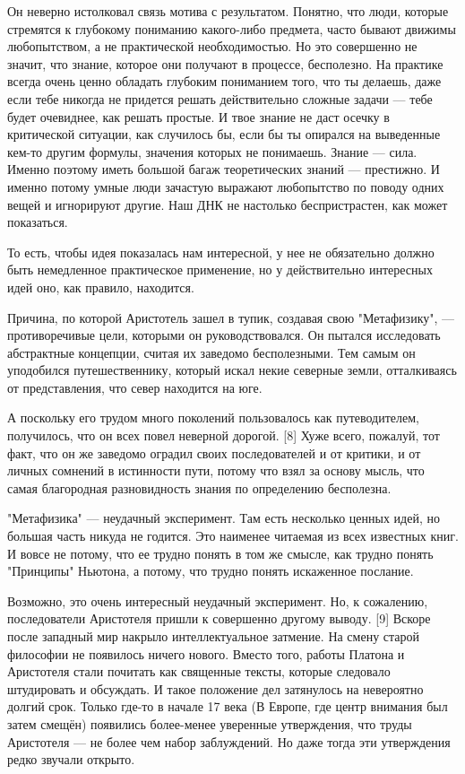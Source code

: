 \documentclass[ebook,12pt,oneside,openany]{memoir}
\begin{document}
Он неверно истолковал связь мотива с результатом. Понятно, что люди,
которые стремятся к глубокому пониманию какого-либо предмета, часто
бывают движимы любопытством, а не практической необходимостью. Но это
совершенно не значит, что знание, которое они получают в процессе,
бесполезно. На практике всегда очень ценно обладать глубоким
пониманием того, что ты делаешь, даже если тебе никогда не придется
решать действительно сложные задачи — тебе будет очевиднее, как решать
простые. И твое знание не даст осечку в критической ситуации, как
случилось бы, если бы ты опирался на выведенные кем-то другим формулы,
значения которых не понимаешь. Знание — сила. Именно поэтому иметь
большой багаж теоретических знаний — престижно. И именно потому умные
люди зачастую выражают любопытство по поводу одних вещей и игнорируют
другие. Наш ДНК не настолько беспристрастен, как может показаться.

То есть, чтобы идея показалась нам интересной, у нее не обязательно
должно быть немедленное практическое применение, но у действительно
интересных идей оно, как правило, находится.

Причина, по которой Аристотель зашел в тупик, создавая свою
"Метафизику", — противоречивые цели, которыми он руководствовался. Он
пытался исследовать абстрактные концепции, считая их заведомо
бесполезными. Тем самым он уподобился путешественнику, который искал
некие северные земли, отталкиваясь от представления, что север
находится на юге.

А поскольку его трудом много поколений пользовалось как путеводителем,
получилось, что он всех повел неверной дорогой. [8] Хуже всего,
пожалуй, тот факт, что он же заведомо оградил своих последователей и
от критики, и от личных сомнений в истинности пути, потому что взял за
основу мысль, что самая благородная разновидность знания по
определению бесполезна.

"Метафизика" — неудачный эксперимент. Там есть несколько ценных идей,
но большая часть никуда не годится. Это наименее читаемая из всех
известных книг. И вовсе не потому, что ее трудно понять в том же
смысле, как трудно понять "Принципы" Ньютона, а потому, что трудно
понять искаженное послание.

Возможно, это очень интересный неудачный эксперимент. Но, к сожалению,
последователи Аристотеля пришли к совершенно другому выводу. [9]
Вскоре после западный мир накрыло интеллектуальное затмение. На смену
старой философии не появилось ничего нового. Вместо того, работы
Платона и Аристотеля стали почитать как священные тексты, которые
следовало штудировать и обсуждать. И такое положение дел затянулось на
невероятно долгий срок. Только где-то в начале 17 века (В Европе, где
центр внимания был затем смещён) появились более-менее уверенные
утверждения, что труды Аристотеля — не более чем набор заблуждений. Но
даже тогда эти утверждения редко звучали открыто.
\end{document}
